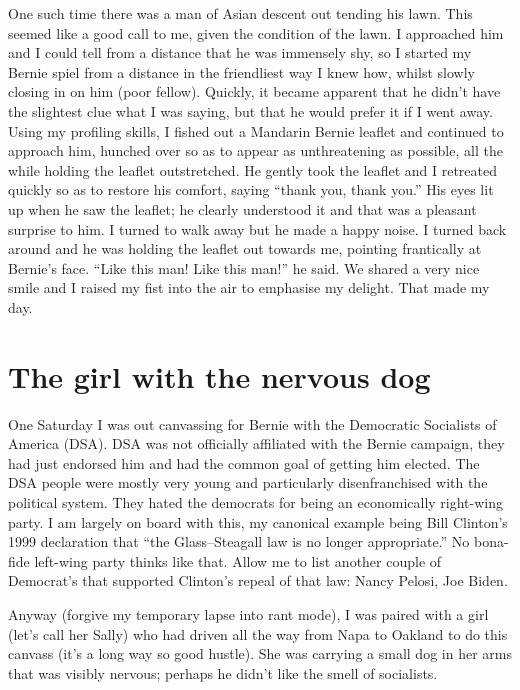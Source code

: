 \documentclass[]{book}
\begin{document}
One such time there was a man of Asian descent out tending his lawn. This seemed like a good call to me, given the condition of the lawn. I approached him and I could tell from a distance that he was immensely shy, so I started my Bernie spiel from a distance in the friendliest way I knew how, whilst slowly closing in on him (poor fellow). Quickly, it became apparent that he didn't have the slightest clue what I was saying, but that he would prefer it if I went away. Using my profiling skills, I fished out a Mandarin Bernie leaflet and continued to approach him, hunched over so as to appear as unthreatening as possible, all the while holding the leaflet outstretched. He gently took the leaflet and I retreated quickly so as to restore his comfort, saying ``thank you, thank you.'' His eyes lit up when he saw the leaflet; he clearly understood it and that was a pleasant surprise to him. I turned to walk away but he made a happy noise. I turned back around and he was holding the leaflet out towards me, pointing frantically at Bernie's face. ``Like this man! Like this man!'' he said. We shared a very nice smile and I raised my fist into the air to emphasise my delight. That made my day.

\hypertarget{the-girl-with-the-nervous-dog}{%
\section{The girl with the nervous dog}\label{the-girl-with-the-nervous-dog}}

One Saturday I was out canvassing for Bernie with the Democratic Socialists of America (DSA). DSA was not officially affiliated with the Bernie campaign, they had just endorsed him and had the common goal of getting him elected. The DSA people were mostly very young and particularly disenfranchised with the political system. They hated the democrats for being an economically right-wing party. I am largely on board with this, my canonical example being Bill Clinton's 1999 declaration that ``the Glass--Steagall law is no longer appropriate.'' No bona-fide left-wing party thinks like that. Allow me to list another couple of Democrat's that supported Clinton's repeal of that law: Nancy Pelosi, Joe Biden.

Anyway (forgive my temporary lapse into rant mode), I was paired with a girl (let's call her Sally) who had driven all the way from Napa to Oakland to do this canvass (it's a long way so good hustle). She was carrying a small dog in her arms that was visibly nervous; perhaps he didn't like the smell of socialists.
\end{document}
